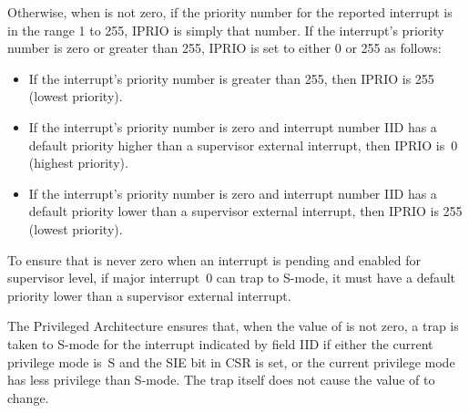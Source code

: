 Otherwise, when  is not zero, if the priority number for the reported
interrupt is in the range 1 to 255, IPRIO is simply that number.
If the interrupt's priority number is zero or greater than 255,
IPRIO is set to either 0 or 255 as follows:
\begin{itemize}

\item
If the interrupt's priority number is greater than 255, then
IPRIO is 255 (lowest priority).

\item
If the interrupt's priority number is zero and interrupt number IID has
a default priority higher than a supervisor external interrupt, then
IPRIO is~0 (highest priority).

\item
If the interrupt's priority number is zero and interrupt number IID
has a default priority lower than a supervisor external interrupt, then
IPRIO is 255 (lowest priority).

\end{itemize}

\begin{commentary}
To ensure that  is never zero when an interrupt is pending
and enabled for supervisor level, if major interrupt~0 can trap to
\hbox{S-mode}, it must have a default priority lower than a supervisor
external interrupt.
\end{commentary}

The {\RISCV} Privileged Architecture ensures that, when the value
of  is not zero, a trap is taken to \mbox{S-mode} for the
interrupt indicated by field IID if either the current privilege
mode is~S and the SIE bit in CSR  is set, or the current
privilege mode has less privilege than \mbox{S-mode}.
The trap itself does not cause the value of  to change.

